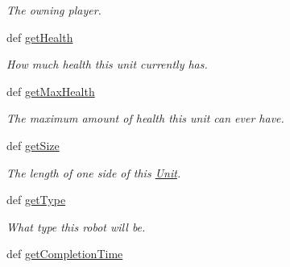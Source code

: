 \begin{DoxyCompactItemize}
\begin{DoxyCompactList}\small\item\em The owning player. \item\end{DoxyCompactList}\item 
\hypertarget{classGameObject_1_1Frame_af036b32ae2bcf9f4acd11fda90146de0}{
def \hyperlink{classGameObject_1_1Frame_af036b32ae2bcf9f4acd11fda90146de0}{getHealth}}
\label{classGameObject_1_1Frame_af036b32ae2bcf9f4acd11fda90146de0}

\begin{DoxyCompactList}\small\item\em How much health this unit currently has. \item\end{DoxyCompactList}\item 
\hypertarget{classGameObject_1_1Frame_a2a99efc2530cccc2df244e5afbdd2048}{
def \hyperlink{classGameObject_1_1Frame_a2a99efc2530cccc2df244e5afbdd2048}{getMaxHealth}}
\label{classGameObject_1_1Frame_a2a99efc2530cccc2df244e5afbdd2048}

\begin{DoxyCompactList}\small\item\em The maximum amount of health this unit can ever have. \item\end{DoxyCompactList}\item 
\hypertarget{classGameObject_1_1Frame_a472830a60e54160e0e0c745767f1003b}{
def \hyperlink{classGameObject_1_1Frame_a472830a60e54160e0e0c745767f1003b}{getSize}}
\label{classGameObject_1_1Frame_a472830a60e54160e0e0c745767f1003b}

\begin{DoxyCompactList}\small\item\em The length of one side of this \hyperlink{classGameObject_1_1Unit}{Unit}. \item\end{DoxyCompactList}\item 
\hypertarget{classGameObject_1_1Frame_a4ef8a1df648fef94d8eafcdb9402b600}{
def \hyperlink{classGameObject_1_1Frame_a4ef8a1df648fef94d8eafcdb9402b600}{getType}}
\label{classGameObject_1_1Frame_a4ef8a1df648fef94d8eafcdb9402b600}

\begin{DoxyCompactList}\small\item\em What type this robot will be. \item\end{DoxyCompactList}\item 
\hypertarget{classGameObject_1_1Frame_a01209c50114ad06ca2851d0aefeca33d}{
def \hyperlink{classGameObject_1_1Frame_a01209c50114ad06ca2851d0aefeca33d}{getCompletionTime}}
\label{classGameObject_1_1Frame_a01209c50114ad06ca2851d0aefeca33d}


\end{DoxyCompactItemize}
